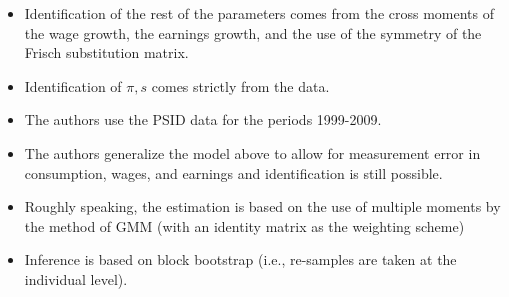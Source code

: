 \documentclass[notes=show]{beamer}
\begin{document}
\begin{frame}%



\begin{itemize}
\item Identification of the rest of the parameters comes from the cross
moments of the wage growth, the earnings growth, and the use of the symmetry
of the Frisch substitution matrix.

\item Identification of $\pi ,s$ comes strictly from the data.

\item The authors use the PSID data for the periods 1999-2009.

\item The authors generalize the model above to allow for measurement error
in consumption, wages, and earnings and identification is still possible.

\item Roughly speaking, the estimation is based on the use of multiple
moments by the method of GMM (with an identity matrix as the weighting
scheme)

\item Inference is based on block bootstrap (i.e., re-samples are taken at
the individual level).
\end{itemize}

\transboxout%
\end{frame}%

\bigskip
\end{document}
